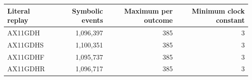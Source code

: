 \begin{center}
\small
\begin{tabular}{@{}lrrr@{}}
\toprule
Literal replay & Symbolic events & Maximum per outcome & Minimum clock constant\\
\midrule
AX11GDH & 1,096,397 & 385 & 3\\
AX11GDHS & 1,100,351 & 385 & 3\\
AX11GDHF & 1,095,737 & 385 & 3\\
AX11GDHR & 1,096,717 & 385 & 3\\
\bottomrule
\end{tabular}
\end{center}
